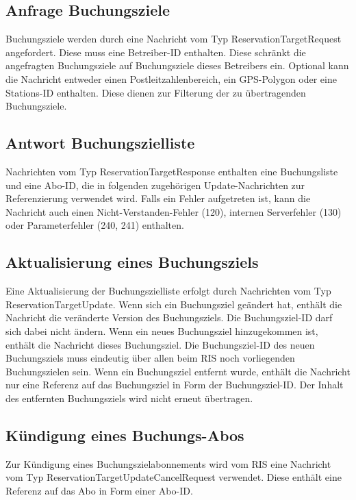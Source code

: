 

\subsection{Anfrage Buchungsziele}
Buchungsziele werden durch eine Nachricht vom Typ ReservationTargetRequest angefordert. Diese muss eine Betreiber-ID enthalten. Diese schränkt die angefragten Buchungsziele auf Buchungsziele dieses Betreibers ein. Optional kann die Nachricht entweder einen Postleitzahlenbereich, ein GPS-Polygon oder eine Stations-ID enthalten. Diese dienen zur Filterung der zu übertragenden Buchungsziele.



\subsection{Antwort Buchungszielliste}
Nachrichten vom Typ ReservationTargetResponse enthalten eine Buchungsliste und eine Abo-ID, die in folgenden zugehörigen Update-Nachrichten zur Referenzierung verwendet wird. Falls ein Fehler aufgetreten ist, kann die Nachricht auch einen Nicht-Verstanden-Fehler (120), internen Serverfehler (130) oder Parameterfehler (240, 241) enthalten.



\subsection{Aktualisierung eines Buchungsziels}
Eine Aktualisierung der Buchungszielliste erfolgt durch Nachrichten vom Typ ReservationTargetUpdate. Wenn sich ein Buchungsziel geändert hat, enthält die Nachricht die veränderte Version des Buchungsziels. Die Buchungsziel-ID darf sich dabei nicht ändern. Wenn ein neues Buchungsziel hinzugekommen ist, enthält die Nachricht dieses Buchungsziel. Die Buchungsziel-ID des neuen Buchungsziels muss eindeutig über allen beim RIS noch vorliegenden Buchungszielen sein. Wenn ein Buchungsziel entfernt wurde, enthält die Nachricht nur eine Referenz auf das Buchungsziel in Form der Buchungsziel-ID. Der Inhalt des entfernten Buchungsziels wird nicht erneut übertragen.



\subsection{Kündigung eines Buchungs-Abos}
Zur Kündigung eines Buchungszielabonnements wird vom RIS eine Nachricht vom Typ ReservationTargetUpdateCancelRequest verwendet. Diese enthält eine Referenz auf das Abo in Form einer Abo-ID.

